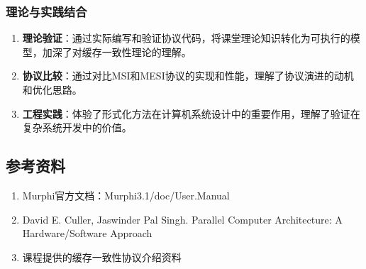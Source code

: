 \documentclass[a4paper]{article}
\begin{document}
\subsubsection{理论与实践结合}

\begin{enumerate}
    \item \textbf{理论验证}：通过实际编写和验证协议代码，将课堂理论知识转化为可执行的模型，加深了对缓存一致性理论的理解。

    \item \textbf{协议比较}：通过对比MSI和MESI协议的实现和性能，理解了协议演进的动机和优化思路。

    \item \textbf{工程实践}：体验了形式化方法在计算机系统设计中的重要作用，理解了验证在复杂系统开发中的价值。
\end{enumerate}

\subsection{参考资料}

\begin{enumerate}
    \item Murphi官方文档：Murphi3.1/doc/User.Manual
    \item David E. Culler, Jaswinder Pal Singh. Parallel Computer Architecture: A Hardware/Software Approach
    \item 课程提供的缓存一致性协议介绍资料
\end{enumerate}
\end{document}
